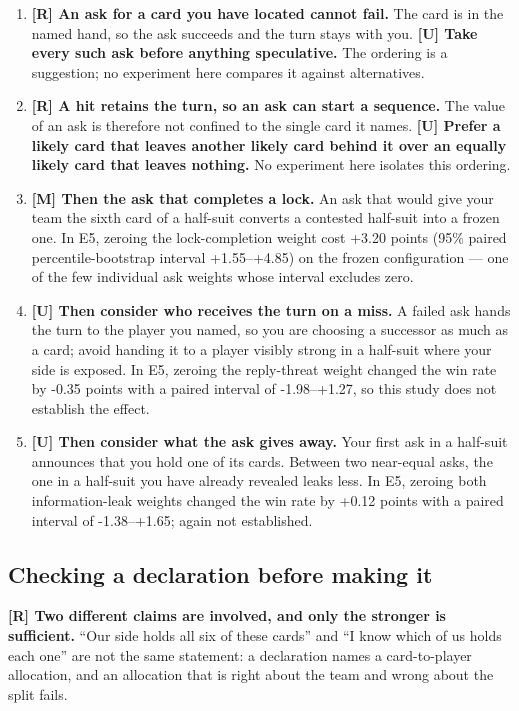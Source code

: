 \documentclass[11pt]{article}
\theoremstyle{definition}
\newcommand{\numAblLockWeight}{+3.20}
\newcommand{\numAblLockWeightCI}{+1.55--+4.85}
\newcommand{\numAblThreat}{-0.35}
\newcommand{\numAblThreatCI}{-1.98--+1.27}
\newcommand{\numAblLeak}{+0.12}
\newcommand{\numAblLeakCI}{-1.38--+1.65}
\begin{document}
\begin{enumerate}[leftmargin=2em]
\item \textbf{[R] An ask for a card you have located cannot fail.} The card is
in the named hand, so the ask succeeds and the turn stays with you.
\textbf{[U] Take every such ask before anything speculative.} The ordering is a
suggestion; no experiment here compares it against alternatives.
\item \textbf{[R] A hit retains the turn, so an ask can start a sequence.} The
value of an ask is therefore not confined to the single card it names.
\textbf{[U] Prefer a likely card that leaves another likely card behind it over
an equally likely card that leaves nothing.} No experiment here isolates this
ordering.
\item \textbf{[M] Then the ask that completes a lock.} An ask that would give
your team the sixth card of a half-suit converts a contested half-suit into a
frozen one. In E5, zeroing the lock-completion weight cost \numAblLockWeight{}
points (95\% paired percentile-bootstrap interval \numAblLockWeightCI{}) on the
frozen configuration --- one of the few individual ask weights whose interval
excludes zero.
\item \textbf{[U] Then consider who receives the turn on a miss.} A failed ask
hands the turn to the player you named, so you are choosing a successor as much
as a card; avoid handing it to a player visibly strong in a half-suit where your
side is exposed. In E5, zeroing the reply-threat weight changed the win rate by
\numAblThreat{} points with a paired interval of \numAblThreatCI{}, so this
study does not establish the effect.
\item \textbf{[U] Then consider what the ask gives away.} Your first ask in a
half-suit announces that you hold one of its cards. Between two near-equal asks,
the one in a half-suit you have already revealed leaks less. In E5, zeroing both
information-leak weights changed the win rate by \numAblLeak{} points with a
paired interval of \numAblLeakCI{}; again not established.
\end{enumerate}

\subsection{Checking a declaration before making it}
\label{app:human-declare}

\textbf{[R] Two different claims are involved, and only the stronger is
sufficient.} ``Our side holds all six of these cards'' and ``I know which of us
holds each one'' are not the same statement: a declaration names a
card-to-player allocation, and an allocation that is right about the team and
wrong about the split fails.
\end{document}

